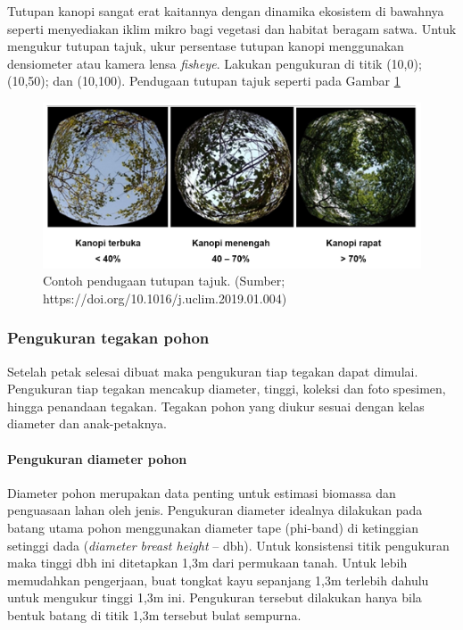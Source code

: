 \documentclass[
  oneside]{book}
\begin{document}
Tutupan kanopi sangat erat kaitannya dengan dinamika ekosistem di bawahnya seperti menyediakan iklim mikro bagi vegetasi dan habitat beragam satwa. Untuk mengukur tutupan tajuk, ukur persentase tutupan kanopi menggunakan densiometer atau kamera lensa \emph{fisheye}. Lakukan pengukuran di titik (10,0); (10,50); dan (10,100). Pendugaan tutupan tajuk seperti pada Gambar \ref{fig:figpkv}

\begin{figure}

{\centering \includegraphics[width=1\linewidth]{images/pkv_ilustration} 

}

\caption{Contoh pendugaan tutupan tajuk. (Sumber; https://doi.org/10.1016/j.uclim.2019.01.004)}\label{fig:figpkv}
\end{figure}

\hypertarget{pengukuran-tegakan-pohon}{%
\subsubsection*{Pengukuran tegakan pohon}\label{pengukuran-tegakan-pohon}}

Setelah petak selesai dibuat maka pengukuran tiap tegakan dapat dimulai. Pengukuran tiap tegakan mencakup diameter, tinggi, koleksi dan foto spesimen, hingga penandaan tegakan. Tegakan pohon yang diukur sesuai dengan kelas diameter dan anak-petaknya.

\hypertarget{pengukuran-diameter-pohon}{%
\paragraph*{Pengukuran diameter pohon}\label{pengukuran-diameter-pohon}}

Diameter pohon merupakan data penting untuk estimasi biomassa dan penguasaan lahan oleh jenis. Pengukuran diameter idealnya dilakukan pada batang utama pohon menggunakan diameter tape (phi-band) di ketinggian setinggi dada (\emph{diameter breast height} -- dbh). Untuk konsistensi titik pengukuran maka tinggi dbh ini ditetapkan 1,3m dari permukaan tanah. Untuk lebih memudahkan pengerjaan, buat tongkat kayu sepanjang 1,3m terlebih dahulu untuk mengukur tinggi 1,3m ini. Pengukuran tersebut dilakukan hanya bila bentuk batang di titik 1,3m tersebut bulat sempurna.
\end{document}
